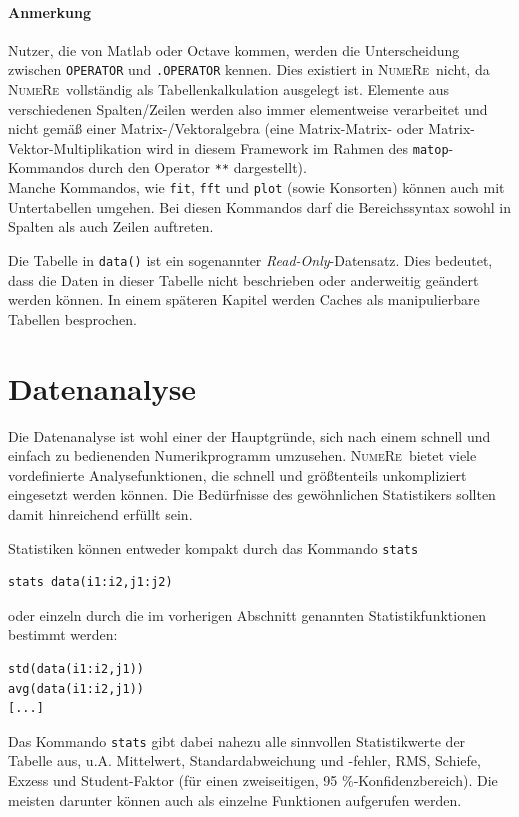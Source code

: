 \documentclass[DIV=14,headsepline,footsepline]{scrbook}
\newcommand{\NR}{\textsc{Nu\-me\-Re}}
\begin{document}
				\paragraph{Anmerkung}
					Nutzer, die von Matlab oder Octave kommen, werden die Unterscheidung zwischen \lstinline+OPERATOR+ und \lstinline+.OPERATOR+ kennen. Dies existiert in \NR\ nicht, da \NR\ vollständig als Tabellenkalkulation ausgelegt ist. Elemente aus verschiedenen Spalten/Zeilen werden also immer elementweise verarbeitet und nicht gemäß einer Matrix-/Vektoralgebra (eine Matrix-Matrix- oder Matrix-Vektor-Multiplikation wird in diesem Framework im Rahmen des \lstinline+matop+-Kommandos durch den Operator \lstinline+**+ dargestellt).\bigskip\\
				Manche Kommandos, wie \lstinline+fit+, \lstinline+fft+ und \lstinline+plot+ (sowie Konsorten) können auch mit Untertabellen umgehen. Bei diesen Kommandos darf die Bereichssyntax sowohl in Spalten als auch Zeilen auftreten.
				
				Die Tabelle in \lstinline+data()+ ist ein sogenannter \emph{Read-Only}-Datensatz. Dies bedeutet, dass die Daten in dieser Tabelle nicht beschrieben oder anderweitig geändert werden können. In einem späteren Kapitel werden Caches als manipulierbare Tabellen besprochen.
				
			\section{Datenanalyse}
				Die Datenanalyse ist wohl einer der Hauptgründe, sich nach einem schnell und einfach zu bedienenden Numerikprogramm umzusehen. \NR\ bietet viele vordefinierte Analysefunktionen, die schnell und größtenteils unkompliziert eingesetzt werden können. Die Bedürfnisse des gewöhnlichen Statistikers sollten damit hinreichend erfüllt sein.
				
				Statistiken können entweder kompakt durch das Kommando \lstinline+stats+
				\begin{lstlisting}
stats data(i1:i2,j1:j2)
				\end{lstlisting}
				oder einzeln durch die im vorherigen Abschnitt genannten Statistikfunktionen bestimmt werden:
				\begin{lstlisting}
std(data(i1:i2,j1))
avg(data(i1:i2,j1))
[...]
				\end{lstlisting}
				Das Kommando \lstinline+stats+ gibt dabei nahezu alle sinnvollen Statistikwerte der Tabelle aus, u.A. Mittelwert, Standardabweichung und -fehler, RMS, Schiefe, Exzess und Student-Faktor (für einen zweiseitigen, 95 \%-Konfidenzbereich). Die meisten darunter können auch als einzelne Funktionen aufgerufen werden.
				
\end{document}
